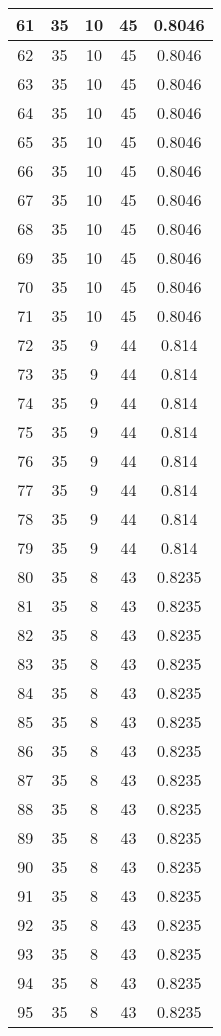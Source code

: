 \documentclass[letterpaper, 12pt]{article}
\begin{document}
\begin{longtable}{|c|c|c|c|c|}
\hline
61 & 35 & 10 & 45 & 0.8046 \\
\hline
62 & 35 & 10 & 45 & 0.8046 \\
\hline
63 & 35 & 10 & 45 & 0.8046 \\
\hline
64 & 35 & 10 & 45 & 0.8046 \\
\hline
65 & 35 & 10 & 45 & 0.8046 \\
\hline
66 & 35 & 10 & 45 & 0.8046 \\
\hline
67 & 35 & 10 & 45 & 0.8046 \\
\hline
68 & 35 & 10 & 45 & 0.8046 \\
\hline
69 & 35 & 10 & 45 & 0.8046 \\
\hline
70 & 35 & 10 & 45 & 0.8046 \\
\hline
71 & 35 & 10 & 45 & 0.8046 \\
\hline
72 & 35 & 9 & 44 & 0.814 \\
\hline
73 & 35 & 9 & 44 & 0.814 \\
\hline
74 & 35 & 9 & 44 & 0.814 \\
\hline
75 & 35 & 9 & 44 & 0.814 \\
\hline
76 & 35 & 9 & 44 & 0.814 \\
\hline
77 & 35 & 9 & 44 & 0.814 \\
\hline
78 & 35 & 9 & 44 & 0.814 \\
\hline
79 & 35 & 9 & 44 & 0.814 \\
\hline
80 & 35 & 8 & 43 & 0.8235 \\
\hline
81 & 35 & 8 & 43 & 0.8235 \\
\hline
82 & 35 & 8 & 43 & 0.8235 \\
\hline
83 & 35 & 8 & 43 & 0.8235 \\
\hline
84 & 35 & 8 & 43 & 0.8235 \\
\hline
85 & 35 & 8 & 43 & 0.8235 \\
\hline
86 & 35 & 8 & 43 & 0.8235 \\
\hline
87 & 35 & 8 & 43 & 0.8235 \\
\hline
88 & 35 & 8 & 43 & 0.8235 \\
\hline
89 & 35 & 8 & 43 & 0.8235 \\
\hline
90 & 35 & 8 & 43 & 0.8235 \\
\hline
91 & 35 & 8 & 43 & 0.8235 \\
\hline
92 & 35 & 8 & 43 & 0.8235 \\
\hline
93 & 35 & 8 & 43 & 0.8235 \\
\hline
94 & 35 & 8 & 43 & 0.8235 \\
\hline
95 & 35 & 8 & 43 & 0.8235 \\

\end{longtable}
\end{document}
